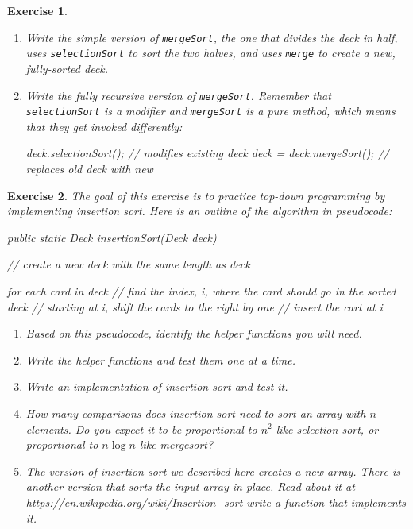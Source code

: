 \documentclass[12pt]{book}
\theoremstyle{exercise}
\newtheorem{exercise}{Exercise}[chapter]
\newcommand{\java}[1]{\verb"#1"}
\newcommand{\java}[1]{\lstinline{#1}} %
\begin{document}
\begin{exercise}
\begin{enumerate}
\item Write the simple version of \java{mergeSort}, the one that divides the deck in half, uses \java{selectionSort} to sort the two halves, and uses \java{merge} to create a new, fully-sorted deck.

\item Write the fully recursive version of \java{mergeSort}.
Remember that \java{selectionSort} is a modifier and \java{mergeSort} is a pure method, which means that they get invoked differently:

\begin{code}
deck.selectionSort();              // modifies existing deck
deck = deck.mergeSort();           // replaces old deck with new
\end{code}

\end{enumerate}
\end{exercise}


\begin{exercise}
The goal of this exercise is to practice top-down programming by implementing insertion sort.
Here is an outline of the algorithm in pseudocode:

\begin{code}
public static Deck insertionSort(Deck deck) {
    // create a new deck with the same length as deck
  
    for each card in deck {
        // find the index, i, where the card should go in the sorted deck
        // starting at i, shift the cards to the right by one
        // insert the cart at i
    }
}
\end{code}


\begin{enumerate}

\item Based on this pseudocode, identify the helper functions you will need.

\item Write the helper functions and test them one at a time.

\item Write an implementation of insertion sort and test it.

\item How many comparisons does insertion sort need to sort an array with $n$ elements.
Do you expect it to be proportional to $n^2$ like selection sort, or proportional to $n \log n$ like mergesort?

\item The version of insertion sort we described here creates a new array.
There is another version that sorts the input array in place.
Read about it at \url{https://en.wikipedia.org/wiki/Insertion_sort} write a function that implements it.

\end{enumerate}

\end{exercise}



\backmatter
\appendix

%
%
%
%

\printindex
\cleardoublepage
\end{document}
